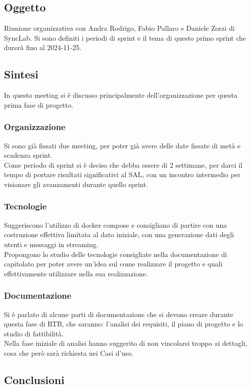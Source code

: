 \documentclass[12pt]{article}
\begin{document}
\subsection{Oggetto}
Riunione organizzativa con Andra Rodrigo, Fabio Pallaro e Daniele Zorzi di SyncLab.
Si sono definiti i periodi di sprint e il tema di questo primo sprint che durerà fino al 2024-11-25.

\subsection{Sintesi}
In questo meeting si è discusso principalmente dell'organizzazione per questa prima fase di progetto.
\subsubsection{Organizzazione}
Si sono già fissati due meeting, per poter già avere delle date fissate di metà e scadenza sprint.\\
Come periodo di sprint si è deciso che debba essere di 2 settimane, per darci il tempo di portare risultati significativi al SAL, con un incontro intermedio   per visionare gli avanzamenti durante quello sprint.

\subsubsection{Tecnologie}
Suggeriscono l'utilizzo di docker compose e consigliano di partire con una costruzione effettiva limitata al dato iniziale, con una generazione dati degli utenti e messaggi in streaming.\\
Propongono lo studio delle tecnologie consigliate nella documentazione di capitolato per poter avere un'idea sul come realizzare il progetto e quali effettivamente utilizzare nella sua realizzazione.

\subsubsection{Documentazione}
Si è parlato di alcune parti di documentazione che si devono creare durante questa fase di RTB, che saranno: l'analisi dei requisiti, il piano di progetto e lo studio di fattibilità.\\
Nella fase iniziale di analisi hanno suggerito di non vincolarsi troppo ai dettagli, cosa che però sarà richiesta nei Casi d'uso.

\subsection{Conclusioni}
\end{document}
